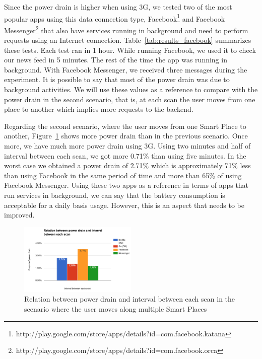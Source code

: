 Since the power drain is higher when using \gls{3G}, we tested two of the most popular apps using this data connection type, Facebook\footnote{http://play.google.com/store/apps/details?id=com.facebook.katana} and Facebook Messenger\footnote{http://play.google.com/store/apps/details?id=com.facebook.orca} that also have services running in background and need to perform requests using an Internet connection.
Table~\ref{tab:results_facebook} summarizes these tests.
Each test ran in 1 hour.
While running Facebook, we used it to check our news feed in 5 minutes. The rest of the time the app was running in background.
With Facebook Messenger, we received three messages during the experiment.
It is possible to say that most of the power drain was due to background activities.
We will use these values as a reference to compare with the power drain in the second scenario, that is, at each scan the user moves from one place to another which implies more requests to the backend.



Regarding the second scenario, where the user moves from one Smart Place to another, Figure~\ref{fig:results_battery_walking} shows more power drain than in the previous scenario.
Once more, we have much more power drain using \gls{3G}.
Using two minutes and half of interval between each scan, we got more 0.71\% than using five minutes.
In the worst case we obtained a power drain of 2.71\% which is approximately 71\% less than using Facebook in the same period of time and more than 65\% of using Facebook Messenger.
Using these two apps as a reference in terms of apps that run services in background, we can say that the battery consumption is acceptable for a daily basis usage.
However, this is an aspect that needs to be improved.

\begin{figure}[!ht]
  \centering
    \includegraphics[width=0.5\textwidth, keepaspectratio]{figures/results_battery_walking}
    \caption[Power drain when the user is moving]{Relation between power drain and interval between each scan in the scenario where the user moves along multiple Smart Places}
    \label{fig:results_battery_walking}
\end{figure}
